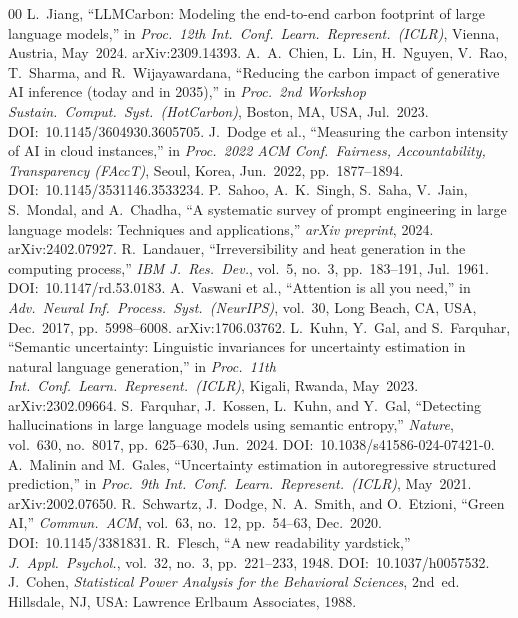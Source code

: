 \documentclass[conference]{IEEEtran}
\begin{document}
\begin{thebibliography}{00}
L.~Jiang,
``LLMCarbon: Modeling the end-to-end carbon footprint of large
language models,''
in \textit{Proc.\ 12th Int.\ Conf.\ Learn.\ Represent.\ (ICLR)},
Vienna, Austria, May~2024.
arXiv:2309.14393.
A.~A.~Chien, L.~Lin, H.~Nguyen, V.~Rao, T.~Sharma, and
R.~Wijayawardana,
``Reducing the carbon impact of generative AI inference (today
and in 2035),''
in \textit{Proc.\ 2nd Workshop Sustain.\ Comput.\ Syst.\
(HotCarbon)}, Boston, MA, USA, Jul.~2023.
DOI:~10.1145/3604930.3605705.
J.~Dodge et al.,
``Measuring the carbon intensity of AI in cloud instances,''
in \textit{Proc.\ 2022 ACM Conf.\ Fairness, Accountability,
Transparency (FAccT)}, Seoul, Korea, Jun.~2022,
pp.~1877--1894.
DOI:~10.1145/3531146.3533234.
P.~Sahoo, A.~K.~Singh, S.~Saha, V.~Jain, S.~Mondal, and
A.~Chadha,
``A systematic survey of prompt engineering in large language
models: Techniques and applications,''
\textit{arXiv preprint}, 2024.
arXiv:2402.07927.
R.~Landauer,
``Irreversibility and heat generation in the computing process,''
\textit{IBM J.~Res.\ Dev.}, vol.~5, no.~3,
pp.~183--191, Jul.~1961.
DOI:~10.1147/rd.53.0183.
A.~Vaswani et al.,
``Attention is all you need,''
in \textit{Adv.\ Neural Inf.\ Process.\ Syst.\ (NeurIPS)},
vol.~30, Long Beach, CA, USA, Dec.~2017, pp.~5998--6008.
arXiv:1706.03762.
L.~Kuhn, Y.~Gal, and S.~Farquhar,
``Semantic uncertainty: Linguistic invariances for uncertainty
estimation in natural language generation,''
in \textit{Proc.\ 11th Int.\ Conf.\ Learn.\ Represent.\ (ICLR)},
Kigali, Rwanda, May~2023.
arXiv:2302.09664.
S.~Farquhar, J.~Kossen, L.~Kuhn, and Y.~Gal,
``Detecting hallucinations in large language models using
semantic entropy,''
\textit{Nature}, vol.~630, no.~8017, pp.~625--630, Jun.~2024.
DOI:~10.1038/s41586-024-07421-0.
A.~Malinin and M.~Gales,
``Uncertainty estimation in autoregressive structured
prediction,''
in \textit{Proc.\ 9th Int.\ Conf.\ Learn.\ Represent.\ (ICLR)},
May~2021.
arXiv:2002.07650.
R.~Schwartz, J.~Dodge, N.~A.~Smith, and O.~Etzioni,
``Green AI,''
\textit{Commun.\ ACM}, vol.~63, no.~12, pp.~54--63, Dec.~2020.
DOI:~10.1145/3381831.
R.~Flesch,
``A new readability yardstick,''
\textit{J.~Appl.\ Psychol.}, vol.~32, no.~3, pp.~221--233,
1948.
DOI:~10.1037/h0057532.
J.~Cohen,
\textit{Statistical Power Analysis for the Behavioral Sciences},
2nd~ed. Hillsdale, NJ, USA: Lawrence Erlbaum Associates, 1988.
\end{thebibliography}
\end{document}
